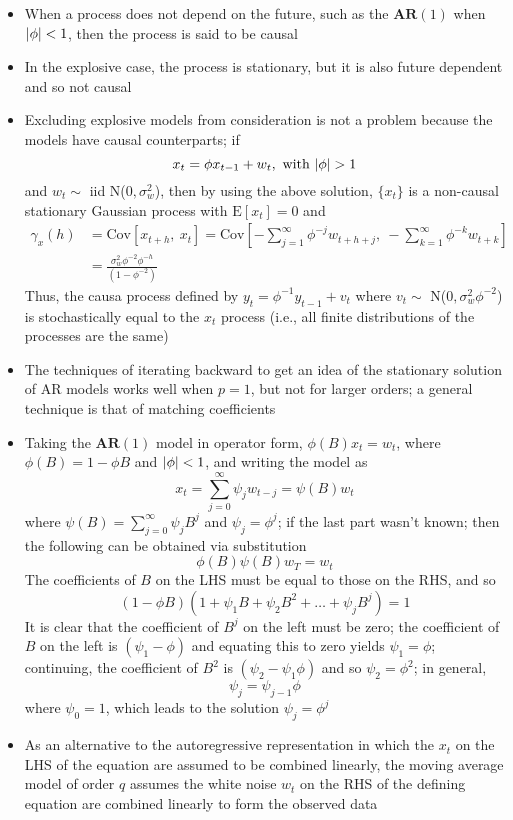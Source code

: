 \documentclass[12pt]{article}
\newcommand{\expe}[1]{\text{E}\left[ #1 \right]}
\newcommand{\cov}[2]{\text{Cov}\left[#1, ~#2\right]}
\newcommand{\ar}[1]{$\mathbf{AR}(#1)$}
\begin{document}
\begin{itemize}
\item When a process does not depend on the future, such as the \ar{1} when $\abs{\phi} < 1$, then the process is said to be causal
\item In the explosive case, the process is stationary, but it is also future dependent and so not causal
\item Excluding explosive models from consideration is not a problem because the models have causal counterparts; if $$ x_t = \phi x_{t-1} + w_t, \text{ with } \abs{\phi} > 1 $$ 
and $w_t \sim$ iid N($0, \sigma^2_w$), then by using the above solution, $\{x_t\}$ is a non-causal stationary Gaussian process with $\expe{x_t} = 0$ and 
$$ \begin{aligned} \gamma_x(h) &= \cov{x_{t+h}}{x_t} = \cov{-\sum_{j=1}^\infty \phi^{-j} w_{t+h+j}}{-\sum_{k=1}^\infty \phi^{-k}w_{t+k}} \\ &= \frac{\sigma^2_w \phi^{-2} \phi^{-h}}{(1-\phi^{-2})} \end{aligned} $$ Thus, the causa process defined by $y_t = \phi^{-1}y_{t-1} + v_t$ where $v_t \sim$ N($0, \sigma^2_w\phi^{-2}$) is stochastically equal to the $x_t$ process (i.e., all finite distributions of the processes are the same)
\item The techniques of iterating backward to get an idea of the stationary solution of AR models works well when $p=1$, but not for larger orders; a general technique is that of matching coefficients
\item Taking the \ar{1} model in operator form, $\phi(B)x_t = w_t$, where $\phi(B) = 1-\phi B$ and $\abs{\phi} < 1$, and writing the model as $$ x_t = \sum_{j=0}^\infty \psi_jw_{t-j} = \psi(B)w_t $$ where $\psi(B) = \sum_{j=0}^\infty \psi_jB^j$ and $\psi_j = \phi^j$; if the last part wasn't known; then the following can be obtained via substitution 
$$ \phi(B)\psi(B)w_T = w_t $$ The coefficients of $B$ on the LHS must be equal to those on the RHS, and so $$ (1 - \phi B)(1 + \psi_1B + \psi_2B^2 + \dots + \psi_jB^j) = 1 $$ It is clear that the coefficient of $B^j$ on the left must be zero; the coefficient of $B$ on the left is $(\psi_1 - \phi)$ and equating this to zero yields $\psi_1 = \phi$; continuing, the coefficient of $B^2$ is $(\psi_2 - \psi_1\phi)$ and so $\psi_2 = \phi^2$; in general, $$ \psi_j = \psi_{j-1}\phi $$ where $\psi_0 = 1$, which leads to the solution $\psi_j = \phi^j$
\item As an alternative to the autoregressive representation in which the $x_t$ on the LHS of the equation are assumed to be combined linearly, the moving average model of order $q$ assumes the white noise $w_t$ on the RHS of the defining equation are combined linearly to form the observed data

\end{itemize}
\end{document}
